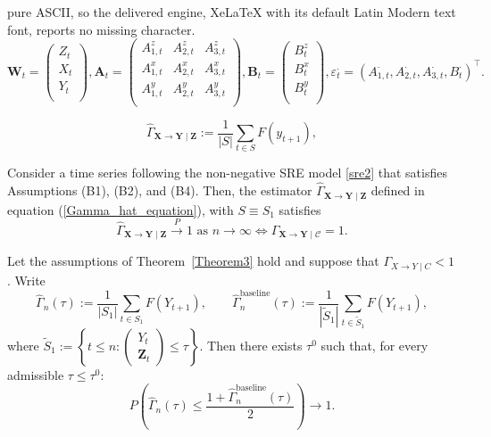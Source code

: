 \documentclass[10pt,a4paper]{amsart}
\begin{document}
pure ASCII, so the delivered engine, XeLaTeX with its default Latin Modern text font, reports no missing character.
\begin{equation}\label{sre2}
\textbf{W}_t = \begin{pmatrix}
Z_t  \\
X_t  \\
Y_t \\
\end{pmatrix}
, 
\textbf{A}_t = \begin{pmatrix}
A^z_{1,t} & A^z_{2,t} & A^z_{3,t} \\
A^x_{1,t} & A^x_{2,t} & A^x_{3,t} \\
A^y_{1,t}& A^y_{2,t} & A^y_{3,t} \\
\end{pmatrix}
, \textbf{B}_t=
\begin{pmatrix}
B^z_{t} \\
B^x_{t}  \\
B^y_{t}  \\
\end{pmatrix}, \varepsilon_t^\cdot = (A^\cdot_{1,t},A^\cdot_{2,t},A^\cdot_{3,t},B^\cdot_t)^\top.
\end{equation}

  \begin{equation}\label{Gamma_hat_equation}
\hat{\Gamma}_{\textbf{X}\to\textbf{Y}\mid\mathcal{\textbf{Z}}}:=\frac{1}{|S|}\sum_{t\in S} F(y_{t+1}),
  \end{equation}

\begin{theorem}\label{Theorem3}
Consider a time series following the non-negative SRE model \eqref{sre2} that satisfies Assumptions (B1), (B2), and (B4). Then, the estimator \(\hat{\Gamma}_{\textbf{X}\to\textbf{Y}\mid \textbf{Z}}\) defined in equation (\ref{Gamma_hat_equation}), with \(S \equiv S_1\) satisfies
\begin{equation}
\label{consistency_theorem2}
\hat{\Gamma}_{\textbf{X}\to\textbf{Y}\mid\textbf{Z}} \overset{P}{\to} 1 \text{   as }n\to\infty\iff  \Gamma_{\textbf{X}\to\textbf{Y}\mid\mathcal{C}} = 1.
\end{equation}
\end{theorem}

\begin{corollary}
\label{consequence_1+gamma/2}
Let the assumptions of Theorem~\ref{Theorem3} hold and suppose that
\(\Gamma_{X\to Y\mid C}<1\). Write 
\[
\widehat\Gamma_n(\tau)
:=
\frac1{|S_1|}\sum_{t\in S_1}F(Y_{t+1}),
\qquad
\widehat\Gamma^{\mathrm{baseline}}_n(\tau)
:=
\frac1{|\widetilde S_1|}
\sum_{t\in \widetilde S_1}F(Y_{t+1}), 
\]
where $\widetilde S_1:=\left\{t\leq n: \begin{pmatrix}Y_t\\ \mathbf Z_t\end{pmatrix}\le \tau\right\}.$ Then there exists \(\tau^0\) such that, for every admissible \(\tau\leq \tau^0\):
\[
P\left(
\widehat\Gamma_n(\tau)
\leq
\frac{1+\widehat\Gamma^{\mathrm{baseline}}_n(\tau)}{2}
\right)\to 1 .
\]
\end{corollary}
\end{document}
